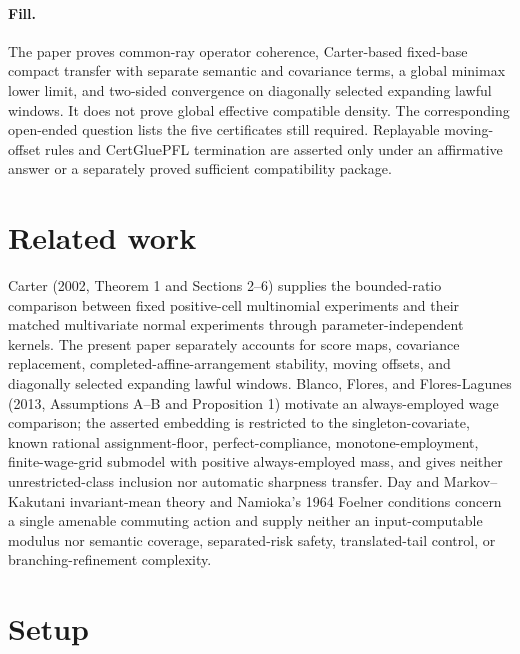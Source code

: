 \documentclass{article}
\begin{document}
\paragraph{Fill.} The paper proves common-ray operator coherence, Carter-based fixed-base compact transfer with separate semantic and covariance terms, a global minimax lower limit, and two-sided convergence on diagonally selected expanding lawful windows. It does not prove global effective compatible density. The corresponding open-ended question lists the five certificates still required. Replayable moving-offset rules and CertGluePFL termination are asserted only under an affirmative answer or a separately proved sufficient compatibility package.

\section{Related work}

Carter (2002, Theorem 1 and Sections 2--6) supplies the bounded-ratio comparison between fixed positive-cell multinomial experiments and their matched multivariate normal experiments through parameter-independent kernels. The present paper separately accounts for score maps, covariance replacement, completed-affine-arrangement stability, moving offsets, and diagonally selected expanding lawful windows. Blanco, Flores, and Flores-Lagunes (2013, Assumptions A--B and Proposition 1) motivate an always-employed wage comparison; the asserted embedding is restricted to the singleton-covariate, known rational assignment-floor, perfect-compliance, monotone-employment, finite-wage-grid submodel with positive always-employed mass, and gives neither unrestricted-class inclusion nor automatic sharpness transfer. Day and Markov--Kakutani invariant-mean theory and Namioka's 1964 Foelner conditions concern a single amenable commuting action and supply neither an input-computable modulus nor semantic coverage, separated-risk safety, translated-tail control, or branching-refinement complexity.

\section{Setup}
\end{document}

